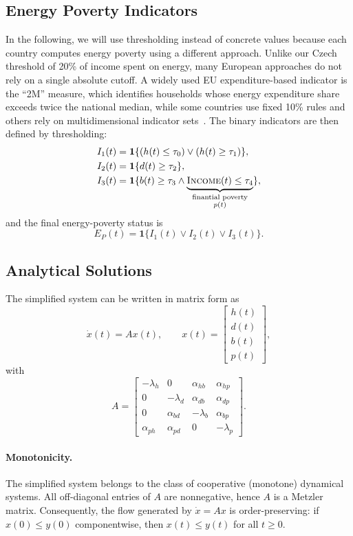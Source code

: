\documentclass[11pt,a4paper]{article}
\begin{document}
\subsection{Energy Poverty Indicators}
In the following, we will use thresholding instead of concrete values because each country computes energy poverty using a different approach. Unlike our Czech threshold of 20\% of income spent on energy, many European approaches do not rely on a single absolute cutoff. A widely used EU expenditure-based indicator is the “2M” measure, which identifies households whose energy expenditure share exceeds twice the national median, while some countries use fixed 10\% rules and others rely on multidimensional indicator sets~\cite{EPAH_indicators_dashboard}. The binary indicators are then defined by thresholding:
\begin{align} \label{binary indicators new}
I_1(t) &= \mathbf{1}\{(h(t)\leq \tau_0)\vee(h(t)\geq\tau_1)\},\\
I_2(t) &= \mathbf{1}\{d(t)\ge \tau_2\},\\
I_3(t) &= \mathbf{1}\{b(t)\ge \tau_3 \land \underbrace{\textsc{Income}(t)\leq \tau_4}_{
  \substack{\text{finantial poverty}\\{p(t)}}
}\},
\end{align}
and the final energy-poverty status is
\[
E_P(t)=\mathbf{1}\{I_1(t)\lor I_2(t)\lor I_3(t)\}.
\]

\subsection{Analytical Solutions}\label{Analytical Solutions}
The simplified system can be written in matrix form as
\[
\dot{x}(t)=Ax(t),
\qquad
x(t)=
\begin{bmatrix}
h(t)\\ d(t)\\ b(t)\\ p(t)
\end{bmatrix},
\]
with
\[
A=
\begin{bmatrix}
-\lambda_h & 0 & \alpha_{hb} & \alpha_{hp}\\
0 & -\lambda_d & \alpha_{db} & \alpha_{dp}\\
0 & \alpha_{bd} & -\lambda_b & \alpha_{bp}\\
\alpha_{ph} & \alpha_{pd} & 0 & -\lambda_p
\end{bmatrix}.
\]




\paragraph{Monotonicity.}
The simplified system belongs to the class of cooperative (monotone) dynamical
systems. All off-diagonal entries of $A$ are nonnegative, hence $A$ is a Metzler
matrix. Consequently, the flow generated by $\dot x = Ax$ is order-preserving:
if $x(0)\le y(0)$ componentwise, then $x(t)\le y(t)$ for all $t\ge0$.
\end{document}
